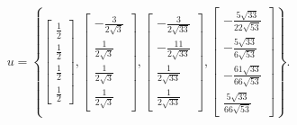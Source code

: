 \[
u = 
    \left\{ 
    \begin{bmatrix}
    \frac{1}{2} \\ 
    \frac{1}{2} \\ 
    \frac{1}{2} \\
    \frac{1}{2}
    \end{bmatrix}
    ,
    \begin{bmatrix}
    -\frac{3}{2 \sqrt{3}} \\ 
    \frac{1}{2 \sqrt{3}} \\ 
    \frac{1}{2 \sqrt{3}} \\
    \frac{1}{2 \sqrt{3}}
    \end{bmatrix}
    ,
    \begin{bmatrix}
    -\frac{3}{2 \sqrt{33}} \\ 
    -\frac{11}{2 \sqrt{33}} \\ 
    \frac{1}{2 \sqrt{33}} \\
    \frac{1}{2 \sqrt{33}}
    \end{bmatrix}
    ,
    \begin{bmatrix}
    -\frac{5 \sqrt{33}}{22 \sqrt{53}} \\ 
    -\frac{5 \sqrt{33}}{6 \sqrt{53}} \\ 
    -\frac{61 \sqrt{33}}{66 \sqrt{53}} \\
    \frac{5 \sqrt{33}}{66 \sqrt{53}}
    \end{bmatrix} \right\}.
    \]